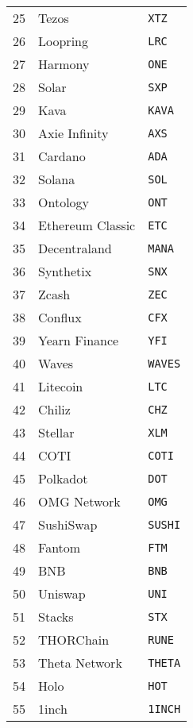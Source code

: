 \begin{longtable}{@{}rll@{}}
25 & Tezos                & \texttt{XTZ} \\
26 & Loopring             & \texttt{LRC} \\
27 & Harmony              & \texttt{ONE} \\
28 & Solar                & \texttt{SXP} \\
29 & Kava                 & \texttt{KAVA} \\
30 & Axie Infinity        & \texttt{AXS} \\
31 & Cardano              & \texttt{ADA} \\
32 & Solana               & \texttt{SOL} \\
33 & Ontology             & \texttt{ONT} \\
34 & Ethereum Classic     & \texttt{ETC} \\
35 & Decentraland         & \texttt{MANA} \\
36 & Synthetix            & \texttt{SNX} \\
37 & Zcash                & \texttt{ZEC} \\
38 & Conflux              & \texttt{CFX} \\
39 & Yearn Finance        & \texttt{YFI} \\
40 & Waves                & \texttt{WAVES} \\
41 & Litecoin             & \texttt{LTC} \\
42 & Chiliz               & \texttt{CHZ} \\
43 & Stellar              & \texttt{XLM} \\
44 & COTI                 & \texttt{COTI} \\
45 & Polkadot             & \texttt{DOT} \\
46 & OMG Network          & \texttt{OMG} \\
47 & SushiSwap            & \texttt{SUSHI} \\
48 & Fantom               & \texttt{FTM} \\
49 & BNB                  & \texttt{BNB} \\
50 & Uniswap              & \texttt{UNI} \\
51 & Stacks               & \texttt{STX} \\
52 & THORChain            & \texttt{RUNE} \\
53 & Theta Network        & \texttt{THETA} \\
54 & Holo                 & \texttt{HOT} \\
55 & 1inch                & \texttt{1INCH} \\

\end{longtable}
